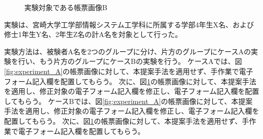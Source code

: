 \begin{figure}[t]
    \begin{center}
        \caption{実験対象である帳票画像B}
        \label{fig:experiment_B}
    \end{center}
\end{figure}

実験は、宮崎大学工学部情報システム工学科に所属する学部4年生X名、および修士1年生Y名、2年生Z名の計A名を対象として行った。

実験方法は、被験者A名を2つのグループに分け、片方のグループにケースAの実験を行い、もう片方のグループにケースBの実験を行う。
ケースAでは、図\ref{fig:experiment_A}の帳票画像に対して、本提案手法を適用せず、手作業で電子フォーム記入欄を配置してもらう。
次に、図\ref{fig:experiment_B}の帳票画像に対して、本提案手法を適用し、修正対象の電子フォーム記入欄を修正し、電子フォーム記入欄を配置してもらう。
ケースBでは、図\ref{fig:experiment_A}の帳票画像に対して、本提案手法を適用し、修正対象の電子フォーム記入欄を修正し、電子フォーム記入欄を配置してもらう。
次に、図\ref{fig:experiment_B}の帳票画像に対して、本提案手法を適用せず、手作業で電子フォーム記入欄を配置してもらう。

